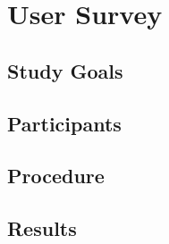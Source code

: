 \chapter{User Survey}
\label{chap:usability}

\section{Study Goals}

\section{Participants}

\section{Procedure}

\section{Results}

